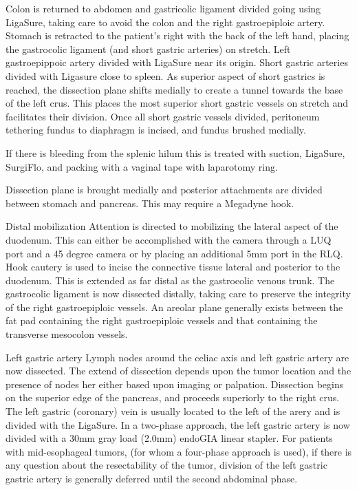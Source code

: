 \documentclass[
]{book}
\begin{document}
Colon is returned to abdomen and gastricolic ligament divided going using LigaSure, taking care to avoid the colon and the right gastroepiploic artery. Stomach is retracted to the patient's right with the back of the left hand, placing the gastrocolic ligament (and short gastric arteries) on stretch. Left gastroepippoic artery divided with LigaSure near its origin. Short gastric arteries divided with Ligasure close to spleen. As superior aspect of short gastrics is reached, the dissection plane shifts medially to create a tunnel towards the base of the left crus. This places the most superior short gastric vessels on stretch and facilitates their division. Once all short gastric vessels divided, peritoneum tethering fundus to diaphragm is incised, and fundus brushed medially.

If there is bleeding from the splenic hilum this is treated with suction, LigaSure, SurgiFlo, and packing with a vaginal tape with laparotomy ring.

Dissection plane is brought medially and posterior attachments are divided between stomach and pancreas. This may require a Megadyne hook.

Distal mobilization
Attention is directed to mobilizing the lateral aspect of the duodenum. This can either be accomplished with the camera through a LUQ port and a 45 degree camera or by placing an additional 5mm port in the RLQ. Hook cautery is used to incise the connective tissue lateral and posterior to the duodenum. This is extended as far distal as the gastrocolic venous trunk. The gastrocolic ligament is now dissected distally, taking care to preserve the integrity of the right gastroepiploic vessels. An areolar plane generally exists between the fat pad containing the right gastroepiploic vessels and that containing the transverse mesocolon vessels.

Left gastric artery
Lymph nodes around the celiac axis and left gastric artery are now dissected. The extend of dissection depends upon the tumor location and the presence of nodes her either based upon imaging or palpation. Dissection begins on the superior edge of the pancreas, and proceeds superiorly to the right crus. The left gastric (coronary) vein is usually located to the left of the arery and is divided with the LigaSure. In a two-phase approach, the left gastric artery is now divided with a 30mm gray load (2.0mm) endoGIA linear stapler. For patients with mid-esophageal tumors, (for whom a four-phase approach is used), if there is any question about the resectability of the tumor, division of the left gastric gastric artery is generally deferred until the second abdominal phase.
\end{document}
